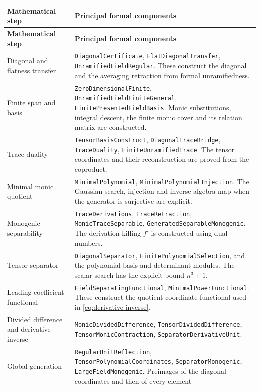 \documentclass[11pt]{article}
\theoremstyle{definition}
\theoremstyle{remark}
\begin{document}
\begin{longtable}{@{}>{\raggedright\arraybackslash}p{}
 >{\raggedright\arraybackslash}p{}@{}}
\textbf{Mathematical step} & \textbf{Principal formal components}\\
\hline
\endfirsthead
\textbf{Mathematical step} & \textbf{Principal formal components}\\
\hline
\endhead
Diagonal and flatness transfer &
\texttt{DiagonalCertificate}, \texttt{FlatDiagonalTransfer},
\texttt{UnramifiedFieldRegular}. These construct the diagonal and
the averaging retraction from formal unramifiedness.\\[5pt]
Finite span and basis &
\texttt{ZeroDimensionalFinite},
\texttt{UnramifiedFieldFiniteGeneral},
\texttt{FinitePresentedFieldBasis}. Monic substitutions, integral
descent, the finite monic cover and its relation matrix are constructed.\\[5pt]
Trace duality &
\texttt{TensorBasisConstruct}, \texttt{DiagonalTraceBridge},
\texttt{TraceDuality}, \texttt{FiniteUnramifiedTrace}. The tensor
coordinates and their reconstruction are proved from the coproduct.\\[5pt]
Minimal monic quotient &
\texttt{MinimalPolynomial}, \texttt{MinimalPolynomialInjection}.
The Gaussian search, injection and inverse algebra map when the
generator is surjective are explicit.\\[5pt]
Monogenic separability &
\texttt{TraceDerivations}, \texttt{TraceRetraction},
\texttt{MonicTraceSeparable}, \texttt{GeneratedSeparableMonogenic}.
The derivation killing $f'$ is constructed using dual numbers.\\[5pt]
Tensor separator &
\texttt{DiagonalSeparator}, \texttt{FinitePolynomialSelection},
and the polynomial-basis and determinant modules. The scalar search
has the explicit bound $n^3+1$.\\[5pt]
Leading-coefficient functional &
\texttt{FieldSeparatingFunctional}, \texttt{MinimalPowerFunctional}.
These construct the quotient coordinate functional used in
\eqref{eq:derivative-inverse}.\\[5pt]
Divided difference and derivative inverse &
\texttt{MonicDividedDifference}, \texttt{TensorDividedDifference},
\texttt{TensorMonicContraction}, \texttt{SeparatorDerivativeUnit}.\\[5pt]
Global generation &
\texttt{RegularUnitReflection}, \texttt{TensorPolynomialCoordinates},
\texttt{SeparatorMonogenic}, \texttt{LargeFieldMonogenic}.
Preimages of the diagonal coordinates and then of every element

\end{longtable}
\end{document}
